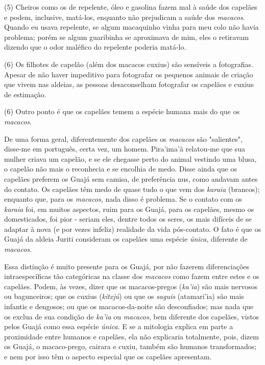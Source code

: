 (5) Cheiros como os de repelente, óleo e gasolina fazem mal à saúde dos
capelães e podem, inclusive, matá-los, enquanto não prejudicam a saúde
dos \emph{macacos}. Quando eu usava repelente, se algum macaquinho vinha
para meu colo não havia problema; porém se algum guaribinha se
aproximava de mim, eles o retiravam dizendo que o odor maléfico do
repelente poderia matá-lo.

(6) Os filhotes de capelão (além dos macacos cuxius) são sensíveis a
fotografias. Apesar de não haver impeditivo para fotografar os pequenos
animais de criação que vivem nas aldeias, as pessoas desaconselham
fotografar os capelães e cuxius de estimação.

(6) Outro ponto é que os capelães temem a espécie humana mais do que os
\emph{macacos}.

De uma forma geral, diferentemente dos capelães os \emph{macacos} são
"salientes", disse-me em português, certa vez, um homem. Pira'ima'ã
relatou-me que sua mulher criava um capelão, e se ele chegasse perto do
animal vestindo uma blusa, o capelão não mais o reconhecia e se encolhia
de medo. Disse ainda que os capelães preferem os Guajá sem camisa, de
preferência nus, como andavam antes do contato. Os capelães têm medo de
quase tudo o que vem dos \emph{karaia} (brancos); enquanto que, para os
\emph{macacos}, nada disso é problema. Se o contato com os \emph{karaia}
foi, em muitos aspectos, ruim para os Guajá, para os capelães, mesmo os
domesticados, foi pior - seriam eles, dentre todos os seres, os mais
difíceis de se adaptar à nova (e por vezes infeliz) realidade da vida
pós-contato. O fato é que os Guajá da aldeia Juriti consideram os
capelães uma espécie \emph{única}, diferente de \emph{macacos}.

Essa distinção é muito presente para os Guajá, por não fazerem
diferenciações intraespecíficas tão categóricas na classe dos
\emph{macacos} como fazem entre estes e os capelães. Podem, às vezes,
dizer que os macacos-pregos (\emph{ka'ia}) são mais nervosos ou
bagunceiros; que os cuxius (\emph{kitxjú}) ou que os \emph{saguis}
(atamari'ia) são mais infantis e dengosos; ou que os macacos-da-noite
são desconfiados; mas nada que os exclua de sua condição de \emph{ka'ia}
ou \emph{macacos}, bem diferente dos capelães, vistos pelos Guajá como
essa espécie \emph{única}. E se a mitologia explica em parte a
proximidade entre humanos e capelães, ela não explicaria totalmente,
pois, dizem os Guajá, o macaco-prego, cairara e cuxiu, também são
humanos transformados; e nem por isso têm o aspecto especial que os
capelães apresentam.

